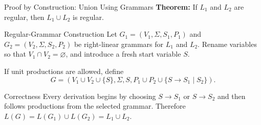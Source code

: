 \documentclass[10pt]{beamer}
\begin{document}
\begin{frame}{Proof by Construction: Union Using Grammars}
  \small
  \textbf{Theorem:} If $L_1$ and $L_2$ are regular, then
  $L_1\cup L_2$ is regular.
  \pause

  \begin{block}{Regular-Grammar Construction}
    Let $G_1=(V_1,\Sigma,S_1,P_1)$ and
    $G_2=(V_2,\Sigma,S_2,P_2)$ be right-linear grammars for $L_1$ and $L_2$.
    Rename variables so that $V_1\cap V_2=\varnothing$, and introduce a fresh
    start variable $S$.

    If unit productions are allowed, define
    \[
      G=(V_1\cup V_2\cup\{S\},\Sigma, S,
      P_1\cup P_2\cup\{S\to S_1\mid S_2\}).
    \]
  \end{block}
  \pause
  
  \begin{block}{Correctness}
    Every derivation begins by choosing $S\to S_1$ or $S\to S_2$ and then follows productions from the selected grammar. Therefore $L(G)=L(G_1)\cup L(G_2)=L_1\cup L_2$.

  \end{block}
\end{frame}
\end{document}
